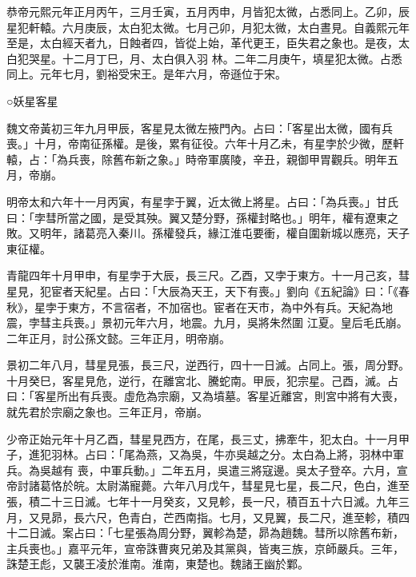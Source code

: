 \begin{pinyinscope}
 恭帝元熙元年正月丙午，三月壬寅，五月丙申，月皆犯太微，占悉同上。乙卯，辰星犯軒轅。六月庚辰，太白犯太微。七月己卯，月犯太微，太白晝見。自義熙元年至是，太白經天者九，日蝕者四，皆從上始，革代更王，臣失君之象也。是夜，太白犯哭星。十二月丁巳，月、太白俱入羽
 林。二年二月庚午，填星犯太微。占悉同上。元年七月，劉裕受宋王。是年六月，帝遜位于宋。



 ○妖星客星



 魏文帝黃初三年九月甲辰，客星見太微左掖門內。占曰：「客星出太微，國有兵喪。」十月，帝南征孫權。是後，累有征役。六年十月乙未，有星孛於少微，歷軒轅，占：「為兵喪，除舊布新之象。」時帝軍廣陵，辛丑，親御甲胃觀兵。明年五月，帝崩。



 明帝太和六年十一月丙寅，有星孛于翼，近太微上將星。占曰：「為兵喪。」甘氏曰：「孛彗所當之國，是受其殃。翼又楚分野，孫權封略也。」明年，權有遼東之敗。又明年，諸葛亮入秦川。孫權發兵，緣江淮屯要衝，權自圍新城以應亮，天子東征權。



 青龍四年十月甲申，有星孛于大辰，長三尺。乙酉，又孛于東方。十一月己亥，彗星見，犯宦者天紀星。占曰：「大辰為天王，天下有喪。」劉向《五紀論》曰：「《春秋》，星孛于東方，不言宿者，不加宿也。宦者在天市，為中外有兵。天紀為地震，孛彗主兵喪。」景初元年六月，地震。九月，吳將朱然圍
 江夏。皇后毛氏崩。二年正月，討公孫文懿。三年正月，明帝崩。



 景初二年八月，彗星見張，長三尺，逆西行，四十一日滅。占同上。張，周分野。十月癸巳，客星見危，逆行，在離宮北、騰蛇南。甲辰，犯宗星。己酉，滅。占曰：「客星所出有兵喪。虛危為宗廟，又為墳墓。客星近離宮，則宮中將有大喪，就先君於宗廟之象也。三年正月，帝崩。



 少帝正始元年十月乙酉，彗星見西方，在尾，長三丈，拂牽牛，犯太白。十一月甲子，進犯羽林。占曰：「尾為燕，又為吳，牛亦吳越之分。太白為上將，羽林中軍兵。為吳越有
 喪，中軍兵動。」二年五月，吳遣三將寇邊。吳太子登卒。六月，宣帝討諸葛恪於皖。太尉滿寵薨。六年八月戊午，彗星見七星，長二尺，色白，進至張，積二十三日滅。七年十一月癸亥，又見軫，長一尺，積百五十六日滅。九年三月，又見昴，長六尺，色青白，芒西南指。七月，又見翼，長二尺，進至軫，積四十二日滅。案占曰：「七星張為周分野，翼軫為楚，昴為趙魏。彗所以除舊布新，主兵喪也。」嘉平元年，宣帝誅曹爽兄弟及其黨與，皆夷三族，京師嚴兵。三年，誅楚王彪，又襲王凌於淮南。淮南，東楚也。魏諸王幽於鄴。




\end{pinyinscope}
